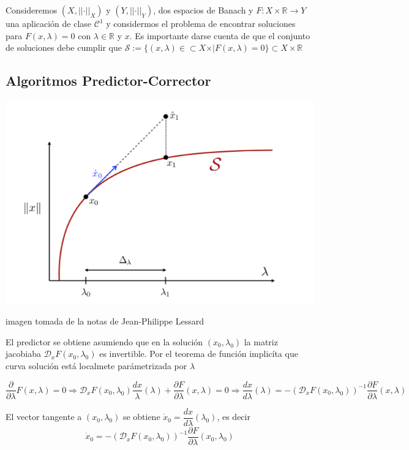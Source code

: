 \documentclass[11pt]{article}
\makeatletter
\def\maxwidth{\ifdim\Gin@nat@width>\linewidth\linewidth
    \else\Gin@nat@width\fi}
\let\Oldincludegraphics\includegraphics
\renewcommand{\includegraphics}[1]{\Oldincludegraphics[width=.8\maxwidth]{#1}}
\makeatother
\begin{document}
    Consideremos \((X, \vert\vert \cdot \vert\vert_{X})\) y
\((Y, \vert\vert \cdot \vert\vert_{Y})\), dos espacios de Banach y
\(F: X\times \mathbb{R} \longrightarrow Y\) una aplicación de clase
\(\mathcal{C} ^1\) y considermos el problema de encontrar soluciones
para \(F(x, \lambda) = 0\) con \(\lambda \in \mathbb{R}\) y \(x\). Es
importante darse cuenta de que el conjunto de soluciones debe cumplir
que
\(\mathcal{S} := \{(x, \lambda) \in \subset X \times \vert F(x, \lambda) = 0 \} \subset X \times \mathbb{R}\)

    \hypertarget{algoritmos-predictor-corrector}{%
\subsection{Algoritmos
Predictor-Corrector}\label{algoritmos-predictor-corrector}}

    \includegraphics{image.png}

imagen tomada de la notas de Jean-Philippe Lessard

    El predictor se obtiene asumiendo que en la solución
\((x_0, \lambda_0)\) la matriz jacobiaba
\(\mathcal{D}_{x}F(x_0, \lambda_0)\) es invertible. Por el teorema de
función implicíta que curva solución está localmete parámetrizada por
\(\lambda\)

\[\dfrac{\partial}{\partial \lambda} F(x , \lambda) = 0 \Longrightarrow \mathcal{D}_{x}F(x_0, \lambda_0) \dfrac{d x}{\lambda}(\lambda)  + \dfrac{\partial F}{\partial \lambda} (x , \lambda) = 0  \Longrightarrow  \dfrac{d x}{d \lambda}(\lambda)  =  -\left( \mathcal{D}_{x}F(x_0, \lambda_0) \right)^{-1} \dfrac{\partial F}{\partial  \lambda} (x , \lambda) \]

El vector tangente a \((x_0, \lambda_0)\) se obtiene
\(\dot{x}_{0} = \dfrac{d x}{d \lambda}(\lambda_0)\), es decir
\[\dot{x}_{0} = -\left( \mathcal{D}_{x}F(x_0, \lambda_0) \right)^{-1} \dfrac{\partial F}{\partial  \lambda} (x_0 , \lambda_0) \]
\end{document}
